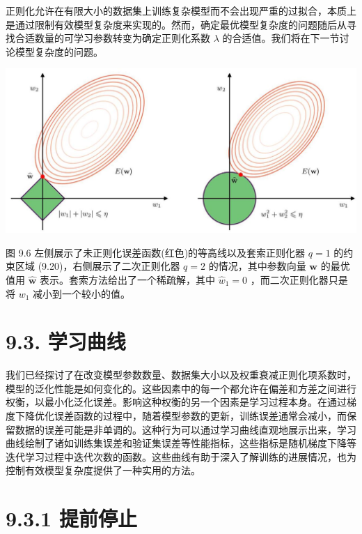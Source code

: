\documentclass[10pt]{article}
\begin{document}
正则化允许在有限大小的数据集上训练复杂模型而不会出现严重的过拟合，本质上是通过限制有效模型复杂度来实现的。然而，确定最优模型复杂度的问题随后从寻找合适数量的可学习参数转变为确定正则化系数 \(\lambda\) 的合适值。我们将在下一节讨论模型复杂度的问题。

\begin{center}
\includegraphics[max width=1.0\textwidth]{images/0194e279-9b28-703a-88f4-c3ac21e2010d_285_237_341_1308_613_0.jpg}
\end{center}
\hspace*{3em} 

图 9.6 左侧展示了未正则化误差函数(红色)的等高线以及套索正则化器 \(q = 1\) 的约束区域 (9.20)，右侧展示了二次正则化器 \(q = 2\) 的情况，其中参数向量 \(\mathbf{w}\) 的最优值用 \(\widehat{\mathbf{w}}\) 表示。套索方法给出了一个稀疏解，其中 \({\widehat{w}}_{1} = 0\) ，而二次正则化器只是将 \({w}_{1}\) 减小到一个较小的值。

\section*{9.3. 学习曲线}

我们已经探讨了在改变模型参数数量、数据集大小以及权重衰减正则化项系数时，模型的泛化性能是如何变化的。这些因素中的每一个都允许在偏差和方差之间进行权衡，以最小化泛化误差。影响这种权衡的另一个因素是学习过程本身。在通过梯度下降优化误差函数的过程中，随着模型参数的更新，训练误差通常会减小，而保留数据的误差可能是非单调的。这种行为可以通过学习曲线直观地展示出来，学习曲线绘制了诸如训练集误差和验证集误差等性能指标，这些指标是随机梯度下降等迭代学习过程中迭代次数的函数。这些曲线有助于深入了解训练的进展情况，也为控制有效模型复杂度提供了一种实用的方法。

\section*{9.3.1 提前停止}
\end{document}
